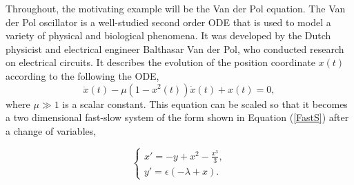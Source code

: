 Throughout, the motivating example will be the Van der Pol equation. The Van der Pol oscillator is a well-studied second order ODE that is used to model a variety of physical and biological phenomena. It was developed by the Dutch physicist and electrical engineer Balthasar Van der Pol, who conducted research on electrical circuits. It describes the evolution of the position coordinate \(x(t)\) according to the following the ODE,
\begin{equation} \label{eq:vdP}
\ddot{x}(t)-\mu\left(1-x^2(t)\right)\dot{x}(t)+x(t)=0,
\end{equation}
where \(\mu \gg 1\) is a scalar constant. This equation can be scaled so that it becomes a two dimensional fast-slow system of the form shown in Equation (\ref{FastS}) after a change of variables,

\begin{equation}
\begin{cases}
x'=-y+x^2-\frac{x^3}{3}, \\
y'=\epsilon(-\lambda+x).
\end{cases}
\label{eq: canonical}
\end{equation}

